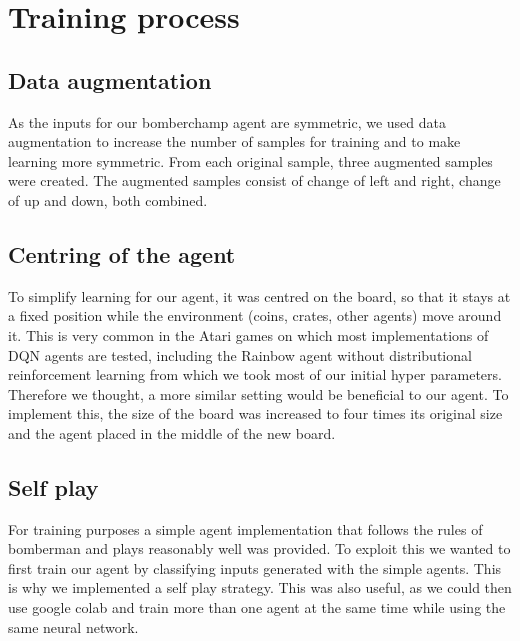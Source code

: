 \documentclass[12pt]{article}
\begin{document}
\section{Training process}

\subsection{Data augmentation}
As the inputs for our bomberchamp agent are symmetric, we used data augmentation to increase the number of samples for training and to make learning more symmetric.
From each original sample, three augmented samples were created. The augmented samples consist of change of left and right, change of up and down, both combined.
\subsection{Centring of the agent}
To simplify learning for our agent, it was centred on the board, so that it stays at a fixed position while the environment (coins, crates, other agents) move around it. This is very common in the Atari games on which most implementations of DQN agents are tested, including the Rainbow agent without distributional reinforcement learning from which we took most of our initial hyper parameters. Therefore we thought, a more similar setting would be beneficial to our agent. To implement this, the size of the board was increased to four times its original size and the agent placed in the middle of the new board.
\subsection{Self play}
For training purposes a simple agent implementation that follows the rules of bomberman and plays reasonably well was provided.
To exploit this we wanted to first train our agent by classifying inputs generated with the simple agents. %
This is why we implemented a self play strategy. This was also useful, as we could then use google colab and train more than one agent at the same time while using the same neural network.



\printbibliography
\end{document}

